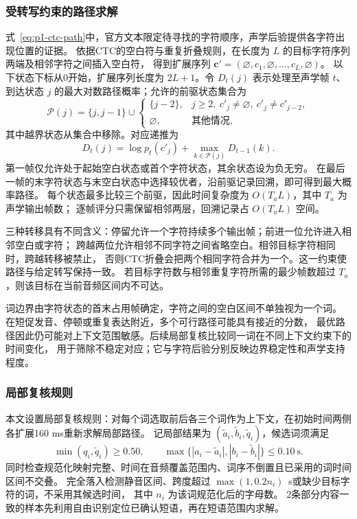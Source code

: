 \documentclass[bwprint]{gmcmthesis}
\begin{document}
\subsubsection{受转写约束的路径求解}
式~\eqref{eq:p1-ctc-path}中，官方文本限定待寻找的字符顺序，声学后验提供各字符出现位置的证据。
依据CTC的空白符与重复折叠规则\citep{graves2006ctc}，在长度为 $L$ 的目标字符序列两端及相邻字符之间插入空白符，
得到扩展序列 $\boldsymbol c'=(\varnothing,c_1,\varnothing,\ldots,c_L,\varnothing)$。
以下状态下标从0开始，扩展序列长度为 $2L+1$。令 $D_t(j)$ 表示处理至声学帧 $t$、
到达状态 $j$ 的最大对数路径概率；允许的前驱状态集合为
\begin{equation}
 \mathcal P(j)=\{j,j-1\}\cup
 \begin{cases}
 \{j-2\},&j\geq2,\ c'_j\ne\varnothing,\ c'_j\ne c'_{j-2},\\
 \varnothing,&\text{其他情况},
 \end{cases}
 \label{eq:p1-ctc-predecessor}
\end{equation}
其中越界状态从集合中移除。对应递推为
\begin{equation}
 D_t(j)=\log p_t(c'_j)+\max_{k\in\mathcal P(j)}D_{t-1}(k).
 \label{eq:p1-ctc-recursion}
\end{equation}
第一帧仅允许处于起始空白状态或首个字符状态，其余状态设为负无穷。
在最后一帧的末字符状态与末空白状态中选择较优者，沿前驱记录回溯，即可得到最大概率路径。
每个状态最多比较三个前驱，因此时间复杂度为 $O(T_aL)$，其中 $T_a$ 为声学输出帧数；
逐帧评分只需保留相邻两层，回溯记录占 $O(T_aL)$ 空间。

三种转移具有不同含义：停留允许一个字符持续多个输出帧；前进一位允许进入相邻空白或字符；
跨越两位允许相邻不同字符之间省略空白。相邻目标字符相同时，跨越转移被禁止，
否则CTC折叠会把两个相同字符合并为一个。这一约束使路径与给定转写保持一致。
若目标字符数与相邻重复字符所需的最少帧数超过 $T_a$，则该目标在当前音频区间内不可达。

词边界由字符状态的首末占用帧确定，字符之间的空白区间不单独视为一个词。
在短促发音、停顿或重复表达附近，多个可行路径可能具有接近的分数，
最优路径因此仍可能对上下文范围敏感。后续局部复核比较同一词在不同上下文约束下的时间变化，
用于筛除不稳定对应；它与字符后验分别反映边界稳定性和声学支持程度。


\subsubsection{局部复核规则}
本文设置局部复核规则：对每个词选取前后各三个词作为上下文，在初始时间两侧各扩展160 ms重新求解局部路径。
记局部结果为 $(\tilde a_i,\tilde b_i,\tilde q_i)$，候选词须满足
\begin{equation}
 \min(q_i,\tilde q_i)\geq0.50,\qquad
 \max\{|a_i-\tilde a_i|,|b_i-\tilde b_i|\}\leq0.10\ \mathrm{s}.
 \label{eq:p1-word-gate}
\end{equation}
同时检查规范化映射完整、时间在音频覆盖范围内、词序不倒置且已采用的词时间区间不交叠。
完全落入检测静音区间、跨度超过 $\max(1,0.2n_i)$~s或缺少目标字符的词，不采用其候选时间，
其中 $n_i$ 为该词规范化后的字母数。
2条部分内容一致的样本先利用自由识别定位已确认短语，再在短语范围内求解。
\end{document}
